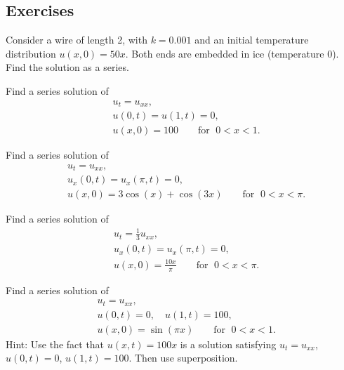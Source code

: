 \subsection{Exercises}

\begin{exercise}
Consider a wire of length 2, with $k=0.001$ and an initial
temperature distribution $u(x,0) = 50 x$.  Both ends
are embedded in ice (temperature 0).  Find the solution as a series.
\end{exercise}

\begin{exercise}
Find a series solution of
\begin{align*}
& u_t =  u_{xx} , \\
& u(0,t) = u(1,t) = 0 , \\
& u(x,0) = 100 \qquad \text{for } \; 0 < x < 1 .
\end{align*}
\end{exercise}

\begin{exercise}
Find a series solution of
\begin{align*}
& u_t =  u_{xx} , \\
& u_x(0,t) = u_x(\pi,t) = 0 , \\
& u(x,0) = 3\cos (x) + \cos (3x) \qquad \text{for } \; 0 < x < \pi .
\end{align*}
\end{exercise}

\begin{exercise} \label{heat:cosexr}
Find a series solution of
\begin{align*}
& u_t = \frac{1}{3} u_{xx} , \\
& u_x(0,t) = u_x(\pi,t) = 0 , \\
& u(x,0) = \frac{10x}{\pi} \qquad \text{for } \; 0 < x < \pi .
\end{align*}
\end{exercise}

\begin{exercise} \label{heat:oneto100exr}
Find a series solution of
\begin{align*}
& u_t =  u_{xx} , \\
& u(0,t) = 0 , \quad u(1,t) = 100 , \\
& u(x,0) = \sin (\pi x) \qquad \text{for } \; 0 < x < 1 .
\end{align*}
Hint: Use the fact that $u(x,t) = 100 x$ is a solution satisfying
$u_t = u_{xx}$, $u(0,t) = 0$, $u(1,t) = 100$.  Then use superposition.
\end{exercise}

